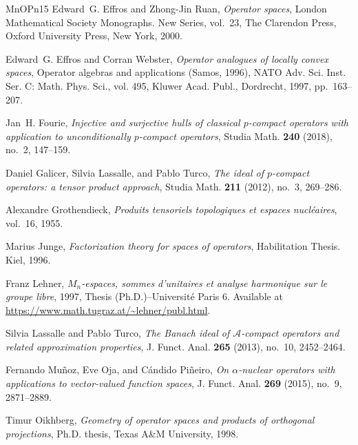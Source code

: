 \documentclass[11pt]{amsart}
\numberwithin{equation}{section}
\begin{document}
\begin{thebibliography}{MnOPn15}
Edward~G. Effros and Zhong-Jin Ruan, \emph{Operator spaces}, London
  Mathematical Society Monographs. New Series, vol.~23, The Clarendon Press,
  Oxford University Press, New York, 2000. 

Edward~G. Effros and Corran Webster, \emph{Operator analogues of locally convex
  spaces}, Operator algebras and applications ({S}amos, 1996), NATO Adv. Sci.
  Inst. Ser. C: Math. Phys. Sci., vol. 495, Kluwer Acad. Publ., Dordrecht,
  1997, pp.~163--207. 

Jan~H. Fourie, \emph{Injective and surjective hulls of classical {$p$}-compact
  operators with application to unconditionally {$p$}-compact operators},
  Studia Math. \textbf{240} (2018), no.~2, 147--159. 

Daniel Galicer, Silvia Lassalle, and Pablo Turco, \emph{The ideal of
  {$p$}-compact operators: a tensor product approach}, Studia Math.
  \textbf{211} (2012), no.~3, 269--286. 

Alexandre Grothendieck, \emph{Produits tensoriels topologiques et espaces
  nucl\'{e}aires}, vol.~16, 1955. 

Marius Junge, \emph{Factorization theory for spaces of operators}, Habilitation
  Thesis. Kiel, 1996.

Franz Lehner, \emph{${M}_n$-espaces, sommes d'unitaires et analyse harmonique
  sur le groupe libre}, 1997, Thesis (Ph.D.)--Université Paris 6. Available at
  \url{https://www.math.tugraz.at/~lehner/publ.html}.

Silvia Lassalle and Pablo Turco, \emph{The {B}anach ideal of
  {$\mathscr{A}$}-compact operators and related approximation properties}, J.
  Funct. Anal. \textbf{265} (2013), no.~10, 2452--2464. 

Fernando Mu\~{n}oz, Eve Oja, and C\'{a}ndido Pi\~{n}eiro, \emph{On
  {$\alpha$}-nuclear operators with applications to vector-valued function
  spaces}, J. Funct. Anal. \textbf{269} (2015), no.~9, 2871--2889. 

Timur Oikhberg, \emph{Geometry of operator spaces and products of orthogonal
  projections}, Ph.D. thesis, Texas A\&M University, 1998.


\end{thebibliography}
\end{document}
